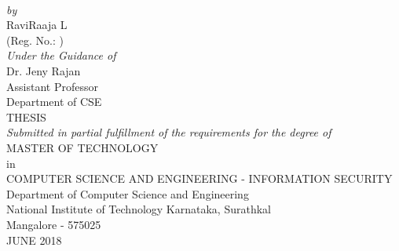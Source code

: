\documentclass[a4paper,12pt, twoside]{NITKReport}
\let\oldemph\emph
\renewcommand\emph[1]{{\fontsize{13pt}{14pt}\selectfont\oldemph{#1}}}
\begin{document}
	\begin{titlepage}
		\begin{center}
			\vspace{14.5pt}
			{\textlcsc{\LARGE \thesistitle}}\\
			\vspace{4.5pt}
			\vspace{20pt}
			\textit {by} \\
			\vspace{20pt}
			{\Large {RaviRaaja L}}\\ 
			{(Reg. No.: \regno)}\\
			\vspace{15pt}
			{\em Under the Guidance of} \\
			\vspace{10pt}
			Dr. Jeny Rajan\\
			Assistant Professor\\
			Department of CSE\\
			\vspace{1.5cm}
			\vspace{-0.25in}
			{THESIS}  \\
			\vspace{1.0cm}
			{\emph {Submitted in partial fulfillment of the requirements for the degree of}} \\
			\vspace{25pt}
			{\Large {MASTER OF TECHNOLOGY}}\\
			\vspace{5pt}
			in\\
			\vspace{5pt}
			{ \Large {COMPUTER SCIENCE AND ENGINEERING - INFORMATION SECURITY}}\\
			\vspace{1.5cm}
			{\Large Department of Computer Science and Engineering }\\
			\vspace{0.2cm}
			{\Large National Institute of Technology Karnataka, Surathkal}\\
			\vspace{0.2cm}
			{\Large Mangalore - 575025}\\
			\vspace{0.5cm}
			{\large JUNE 2018}\\
		\end{center}
	\end{titlepage}
	
\end{document}
